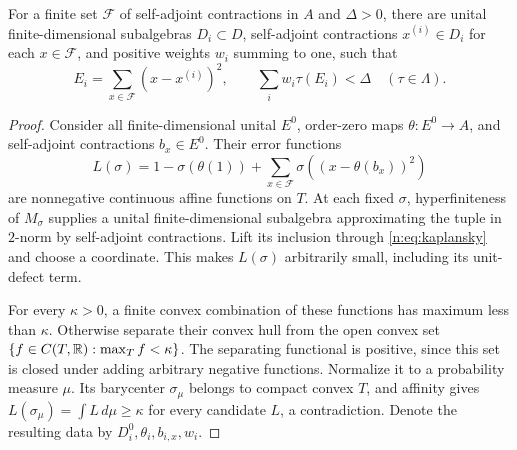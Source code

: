 \begin{proposition}\label{n:prop:models}
For a finite set $\mathcal F$ of self-adjoint contractions in $A$ and
$\Delta>0$, there are unital finite-dimensional subalgebras $D_i\subset D$,
self-adjoint contractions $x^{(i)}\in D_i$ for each $x\in\mathcal F$, and
positive weights $w_i$ summing to one, such that
\begin{equation}\label{n:eq:models}
 E_i=\sum_{x\in\mathcal F}(x-x^{(i)})^2,
 \qquad \sum_iw_i\tau(E_i)<\Delta\quad(\tau\in \Lambda).
\end{equation}
\end{proposition}
\begin{proof}
Consider all finite-dimensional unital $E^0$, order-zero maps
$\theta:E^0\to A$, and self-adjoint contractions $b_x\in E^0$. Their
error functions
\[
 L(\sigma)=1-\sigma(\theta(1))+
       \sum_{x\in\mathcal F}\sigma((x-\theta(b_x))^2)
\]
are nonnegative continuous affine functions on $T$. At each fixed
$\sigma$, hyperfiniteness of $M_\sigma$ supplies a unital
finite-dimensional subalgebra approximating the tuple in $2$-norm by
self-adjoint contractions. Lift its inclusion through
\eqref{n:eq:kaplansky} and choose a coordinate. This makes $L(\sigma)$
arbitrarily small, including its unit-defect term.

For every $\kappa>0$, a finite convex combination of these functions has
maximum less than $\kappa$. Otherwise separate their convex hull from the
open convex set $\{f\in C(T,\mathbb R):\max_Tf<\kappa\}$. The separating
functional is positive, since this set is closed under adding arbitrary
negative functions. Normalize it to a probability measure $\mu$.
Its barycenter $\sigma_\mu$ belongs to compact convex $T$, and affinity
gives $L(\sigma_\mu)=\int L\,d\mu\ge\kappa$ for every candidate $L$,
a contradiction. Denote the resulting data by $D_i^0,\theta_i,b_{i,x},w_i$.


\end{proof}

